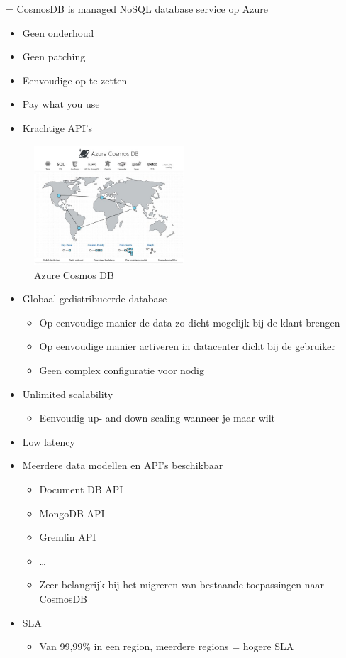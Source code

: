 \documentclass{article}
\begin{document}
= CosmosDB is managed NoSQL database service op Azure

\begin{itemize}
    \item Geen onderhoud
    \item Geen patching
    \item Eenvoudige op te zetten
    \item Pay what you use
    \item Krachtige API's
\end{itemize}

\begin{figure}[H]
    \centering
    \includegraphics[width=0.5\textwidth]{cosmosdb.png}
    \caption{Azure Cosmos DB}
\end{figure}

\begin{itemize}
    \item Globaal gedistribueerde database
    \begin{itemize}
        \item Op eenvoudige manier de data zo dicht mogelijk bij de klant brengen
        \item Op eenvoudige manier activeren in datacenter dicht bij de gebruiker
        \item Geen complex configuratie voor nodig
    \end{itemize}
    \item Unlimited scalability
    \begin{itemize}
        \item Eenvoudig up- and down scaling wanneer je maar wilt
    \end{itemize}
    \item Low latency
    \item Meerdere data modellen en API's beschikbaar
    \begin{itemize}
        \item Document DB API
        \item MongoDB API
        \item Gremlin API
        \item \dots
        \item Zeer belangrijk bij het migreren van bestaande toepassingen naar CosmosDB
    \end{itemize}
    \item SLA
    \begin{itemize}
        \item Van 99,99\% in een region, meerdere regions = hogere SLA
    \end{itemize} 
\end{itemize}
\end{document}
